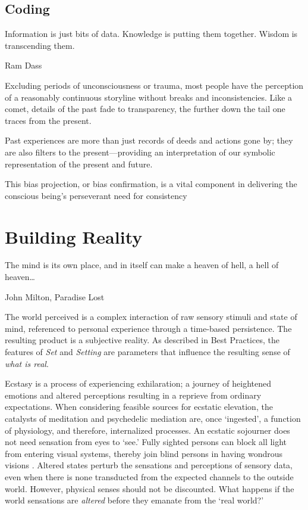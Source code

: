 \documentclass{UIdahoMastersThesis}
\begin{document}
\section{Coding}

\epigraph{Information is just bits of data. Knowledge is putting them together. Wisdom is transcending them.}{Ram Dass}

Excluding periods of unconsciousness or trauma, most people have the perception of a reasonably continuous storyline without breaks and inconsistencies. Like a comet, details of the past fade to transparency, the further down the tail one traces from the present. 

Past experiences are more than just records of deeds and actions gone by; they are also filters to the present---providing an interpretation of our symbolic representation of the present and future.

This bias projection, or bias confirmation, is a vital component in delivering the conscious being's perseverant need for consistency

\clearpage

\chapter{Building Reality}
\noindent
{%
\setlength{\fboxsep}{0pt}%
\setlength{\fboxrule}{1.5pt}%
%
}%
\label{Chapter:BuildingReality}
\epigraph {The mind is its own place, and in itself can make a heaven of hell, a hell of heaven\ldots}{John Milton, Paradise Lost}

\vspace{9mm}

The world perceived is a complex interaction of raw sensory stimuli and state of mind, referenced to personal experience through a time-based persistence. The resulting product is a subjective reality. As described in Best Practices, the features of \emph{Set} and \emph{Setting} are parameters that influence the resulting sense of \emph{what is real}.

Ecstasy is a process of experiencing exhilaration; a journey of heightened emotions and altered perceptions resulting in a reprieve from ordinary expectations. When considering feasible sources for ecstatic elevation, the catalysts of meditation and psychedelic mediation are, once `ingested', a function of physiology, and therefore, internalized processes. An ecstatic sojourner does not need sensation from eyes to `see.' Fully sighted persons can block all light from entering visual systems, thereby join blind persons in having wondrous visions \cite{sacks_hallucinations_2012}. Altered states perturb the sensations and perceptions of sensory data, even when there is none transducted from the expected channels to the outside world. However, physical senses should not be discounted. What happens if the world sensations are \emph{altered} before	they emanate from the `real world?'
\end{document}
